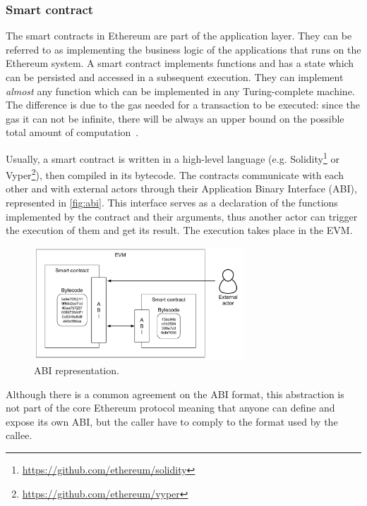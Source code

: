 \subsubsection{Smart contract}
\label{sec:smart-contract}

The smart contracts in Ethereum are part of the application layer. They can be
referred to as implementing the business logic of the applications that runs on
the Ethereum system. A smart contract implements functions and has a state which
can be persisted and accessed in a subsequent execution. They can implement
\emph{almost} any function which can be implemented in any Turing-complete
machine. The difference is due to the gas needed for a transaction to be
executed: since the gas it can not be infinite, there will be always an upper
bound on the possible total amount of computation~\cite{wood2018ethereum}.

Usually, a smart contract is written in a high-level language (e.g.
Solidity\footnote{\url{https://github.com/ethereum/solidity}} or
Vyper\footnote{\url{https://github.com/ethereum/vyper}}), then compiled in its
bytecode. The contracts communicate with each other and with external actors
through their Application Binary Interface (ABI), represented in
\autoref{fig:abi}. This interface serves as a declaration of the functions
implemented by the contract and their arguments, thus another actor can trigger
the execution of them and get its result. The execution takes place in the EVM.

\begin{figure}
	\begin{center}
		\includegraphics[width=0.7\textwidth]{./res/img/abi.pdf}
	\end{center}
	\caption{ABI representation.}
	\label{fig:abi}
\end{figure}

Although there is a common agreement on the ABI format, this abstraction is not
part of the core Ethereum protocol meaning that anyone can define and expose its
own ABI, but the caller have to comply to the format used by the callee.

